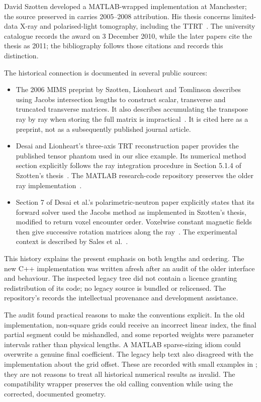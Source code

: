 \documentclass[11pt,a4paper]{article}
\newcommand{\code}[1]{\texttt{\detokenize{#1}}}
\newcommand{\repo}[2]{\href{https://github.com/billlion/jacobsrays/blob/854c6aa60d64be38619be6d268ceb6b7b56da5f7/#1}{\code{#2}}}
\begin{document}
David Szotten developed a MATLAB-wrapped implementation at Manchester;
the source preserved in \code{LRTinMatlab} carries 2005--2008 attribution.
His thesis concerns limited-data X-ray and polarised-light tomography,
including the TTRT~\cite{szotten2011}. The university catalogue records the
award on 3 December 2010, while the later papers cite the thesis as 2011;
the bibliography follows those citations and records this distinction.

The historical connection is documented in several public sources:
\begin{itemize}
\item The 2006 MIMS preprint by Szotten, Lionheart and Tomlinson describes
using Jacobs intersection lengths to construct scalar, transverse and
truncated transverse matrices. It also describes accumulating the transpose
ray by ray when storing the full matrix is impractical~\cite{szotten2006}.
It is cited here as a preprint, not as a subsequently published journal
article.
\item Desai and Lionheart's three-axis TRT reconstruction paper provides
the published tensor phantom used in our slice example. Its numerical
method section explicitly follows the ray integration procedure in
Section 5.1.4 of Szotten's thesis~\cite{desai2016}. The MATLAB research-code repository
preserves the older ray implementation~\cite{lrtmatlab}.
\item Section 7 of Desai et al.'s polarimetric-neutron paper explicitly
states that its forward solver used the Jacobs method as implemented in
Szotten's thesis, modified to return voxel encounter order. Voxelwise
constant magnetic fields then give successive rotation matrices along
the ray~\cite{desai2020}. The experimental context is described by
Sales et al.~\cite{sales2018}.
\end{itemize}

This history explains the present emphasis on both lengths and ordering.
The new C++ implementation was written afresh after an audit of the older
interface and behaviour. The inspected legacy tree did not contain a
licence granting redistribution of its code; no legacy source is bundled
or relicensed. The repository's \code{NOTICE} records the intellectual
provenance and development assistance.

The audit found practical reasons to make the conventions explicit. In the
old implementation, non-square grids could receive an incorrect linear
index, the final partial segment could be mishandled, and some reported
weights were parameter intervals rather than physical lengths. A MATLAB
sparse-sizing idiom could overwrite a genuine final coefficient. The
legacy help text also disagreed with the implementation about the grid
offset. These are recorded with small examples in
\repo{docs/legacy-audit.md}{docs/legacy-audit.md}; they are not reasons to
treat all historical numerical results as invalid. The compatibility
wrapper preserves the old calling convention while using the corrected,
documented geometry.
\end{document}
